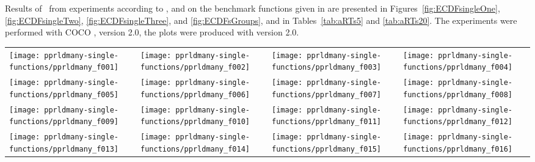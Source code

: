 \documentclass[sigconf]{acmart}
\newcommand{\change}[1]{{\color{red} #1}}
\begin{document}
Results of \algname\ from experiments according to \cite{hansen2016exp}, \cite{hansen2016perfass} and \cite{biobj2016perfass} on the benchmark
functions given in \cite{biobj2016func} are presented in
Figures~\ref{fig:ECDFsingleOne}, \ref{fig:ECDFsingleTwo}, \ref{fig:ECDFsingleThree}, and \ref{fig:ECDFsGroups}, and in
Tables~\ref{tab:aRTs5} and \ref{tab:aRTs20}. The experiments were performed with COCO \cite{hansen2016cocoplat}, version \change{2.0}, the plots were produced with version \change{2.0}.



\begin{figure*}
\centering
\begin{tabular}{@{\hspace*{-0.018\textwidth}}l@{\hspace*{-0.02\textwidth}}l@{\hspace*{-0.02\textwidth}}l@{\hspace*{-0.02\textwidth}}l@{\hspace*{-0.02\textwidth}}}
\texttt{[image: pprldmany-single-functions/pprldmany\_f001]}&
\texttt{[image: pprldmany-single-functions/pprldmany\_f002]}&
\texttt{[image: pprldmany-single-functions/pprldmany\_f003]}&
\texttt{[image: pprldmany-single-functions/pprldmany\_f004]}\\[-1.8ex]
\texttt{[image: pprldmany-single-functions/pprldmany\_f005]}&
\texttt{[image: pprldmany-single-functions/pprldmany\_f006]}&
\texttt{[image: pprldmany-single-functions/pprldmany\_f007]}&
\texttt{[image: pprldmany-single-functions/pprldmany\_f008]}\\[-1.8ex]
\texttt{[image: pprldmany-single-functions/pprldmany\_f009]}&
\texttt{[image: pprldmany-single-functions/pprldmany\_f010]}&
\texttt{[image: pprldmany-single-functions/pprldmany\_f011]}&
\texttt{[image: pprldmany-single-functions/pprldmany\_f012]}\\[-1.8ex]
\texttt{[image: pprldmany-single-functions/pprldmany\_f013]}&
\texttt{[image: pprldmany-single-functions/pprldmany\_f014]}&
\texttt{[image: pprldmany-single-functions/pprldmany\_f015]}&
\texttt{[image: pprldmany-single-functions/pprldmany\_f016]}\\[-1.8ex]
\end{tabular}
 \caption{\label{fig:ECDFsingleOne}
}

\end{figure*}
\end{document}
